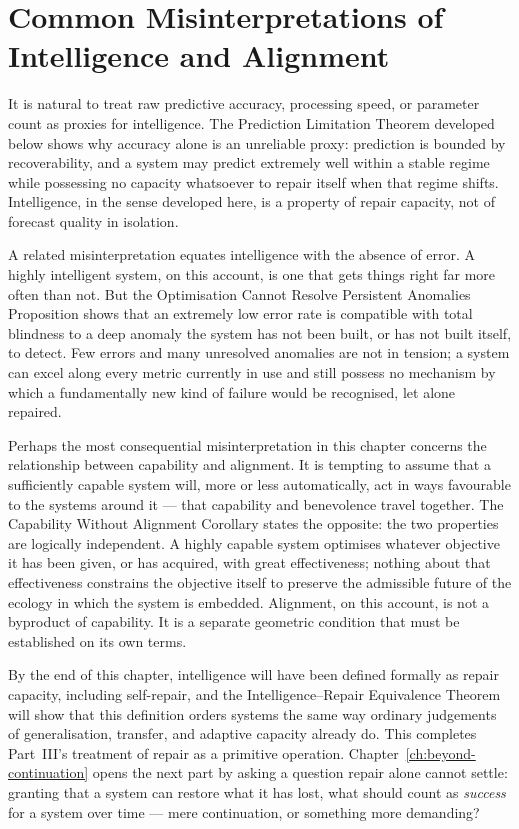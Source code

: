 \documentclass[12pt,twoside,openright]{book}
\begin{document}
\section{Common Misinterpretations of Intelligence and
  Alignment}
\label{sec:ch9-misinterpretations}

It is natural to treat raw predictive accuracy, processing
speed, or parameter count as proxies for intelligence. The
Prediction Limitation Theorem developed below shows why
accuracy alone is an unreliable proxy: prediction is bounded
by recoverability, and a system may predict extremely well
within a stable regime while possessing no capacity
whatsoever to repair itself when that regime shifts.
Intelligence, in the sense developed here, is a property of
repair capacity, not of forecast quality in isolation.

A related misinterpretation equates intelligence with the
absence of error. A highly intelligent system, on this
account, is one that gets things right far more often than
not. But the Optimisation Cannot Resolve Persistent
Anomalies Proposition shows that an extremely low error rate
is compatible with total blindness to a deep anomaly the
system has not been built, or has not built itself, to
detect. Few errors and many unresolved anomalies are not in
tension; a system can excel along every metric currently in
use and still possess no mechanism by which a fundamentally
new kind of failure would be recognised, let alone repaired.

Perhaps the most consequential misinterpretation in this
chapter concerns the relationship between capability and
alignment. It is tempting to assume that a sufficiently
capable system will, more or less automatically, act in ways
favourable to the systems around it --- that capability and
benevolence travel together. The Capability Without
Alignment Corollary states the opposite: the two properties
are logically independent. A highly capable system optimises
whatever objective it has been given, or has acquired, with
great effectiveness; nothing about that effectiveness
constrains the objective itself to preserve the admissible
future of the ecology in which the system is embedded.
Alignment, on this account, is not a byproduct of
capability. It is a separate geometric condition that must
be established on its own terms.

By the end of this chapter, intelligence will have been
defined formally as repair capacity, including self-repair,
and the Intelligence--Repair Equivalence Theorem will show
that this definition orders systems the same way ordinary
judgements of generalisation, transfer, and adaptive capacity
already do. This completes Part~III's treatment of repair as
a primitive operation. Chapter~\ref{ch:beyond-continuation}
opens the next part by asking a question repair alone cannot
settle: granting that a system can restore what it has lost,
what should count as \emph{success} for a system over time
--- mere continuation, or something more demanding?
\end{document}

